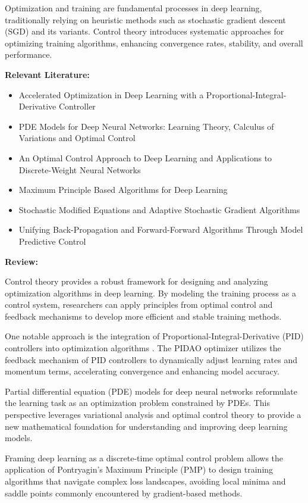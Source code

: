 \documentclass{article}
\theoremstyle{plain}
\theoremstyle{definition}
\theoremstyle{remark}
\begin{document}
Optimization and training are fundamental processes in deep learning, traditionally relying on heuristic methods such as stochastic gradient descent (SGD) and its variants. Control theory introduces systematic approaches for optimizing training algorithms, enhancing convergence rates, stability, and overall performance.

\textbf{Relevant Literature:}
\begin{itemize}
    \item Accelerated Optimization in Deep Learning with a Proportional-Integral-Derivative Controller
    \item PDE Models for Deep Neural Networks: Learning Theory, Calculus of Variations and Optimal Control
    \item An Optimal Control Approach to Deep Learning and Applications to Discrete-Weight Neural Networks
    \item Maximum Principle Based Algorithms for Deep Learning
    \item Stochastic Modified Equations and Adaptive Stochastic Gradient Algorithms
    \item Unifying Back-Propagation and Forward-Forward Algorithms Through Model Predictive Control
\end{itemize}

\textbf{Review:}

Control theory provides a robust framework for designing and analyzing optimization algorithms in deep learning. By modeling the training process as a control system, researchers can apply principles from optimal control and feedback mechanisms to develop more efficient and stable training methods.

One notable approach is the integration of Proportional-Integral-Derivative (PID) controllers into optimization algorithms \cite{chenAcceleratedOptimizationDeep2024}. The PIDAO optimizer utilizes the feedback mechanism of PID controllers to dynamically adjust learning rates and momentum terms, accelerating convergence and enhancing model accuracy.

Partial differential equation (PDE) models for deep neural networks \cite{markowichPDEModelsDeep2024} reformulate the learning task as an optimization problem constrained by PDEs. This perspective leverages variational analysis and optimal control theory to provide a new mathematical foundation for understanding and improving deep learning models.

Framing deep learning as a discrete-time optimal control problem \cite{liOptimalControlApproach2018} allows the application of Pontryagin’s Maximum Principle (PMP) to design training algorithms that navigate complex loss landscapes, avoiding local minima and saddle points commonly encountered by gradient-based methods.
\end{document}

